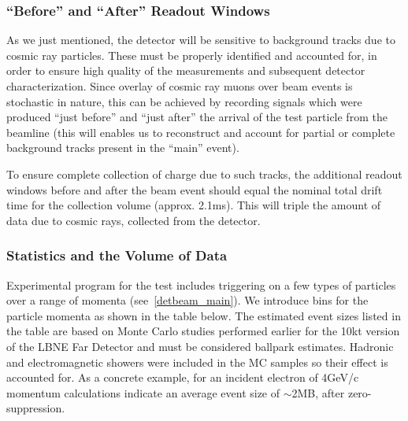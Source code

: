 \subsubsection{``Before'' and ``After'' Readout Windows}
\label{readout_windows}


As we just mentioned, the detector will be sensitive to background tracks due to cosmic ray particles.  These must be properly identified
and accounted for, in order to ensure high quality of the measurements and subsequent detector characterization. Since overlay of cosmic
ray muons over beam events is stochastic in nature, this can be achieved by recording signals which were produced ``just before'' and ``just after''
the arrival of the test particle from the beamline (this will enables us to reconstruct and account for partial or complete background
tracks present in the ``main'' event).

To ensure complete collection of charge due to such tracks, the additional readout windows before and after 
the beam event should equal the nominal total drift time for the collection volume (approx. 2.1ms). This will triple the amount of
data due to cosmic rays, collected from the detector.


\subsubsection{Statistics and the Volume of Data}
\label{bin_table}
Experimental program for the test includes triggering on a few types of particles over a range of momenta (see~\ref{detbeam_main}). We introduce
bins for the particle momenta as shown in the table below. The estimated event sizes listed in the table are based on
Monte Carlo studies performed earlier for the 10kt version of the LBNE Far Detector and must be considered ballpark estimates. Hadronic and electromagnetic
showers were included in the MC samples so their effect is accounted for. As a concrete example, for an incident electron of 4GeV/c momentum
calculations indicate an average event size of $\sim$2MB, after zero-suppression.



